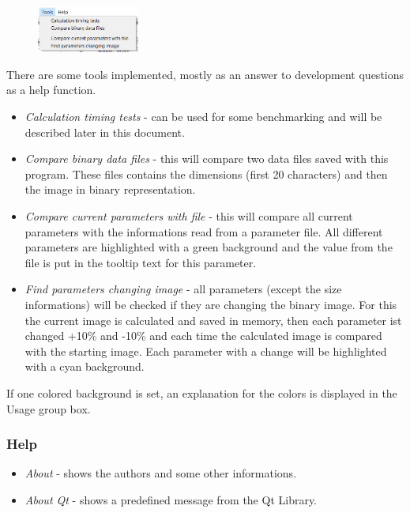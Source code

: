 \documentclass[11pt]{article} %
\begin{document}
\begin{figure}
  \begin{center}
    \includegraphics[width=0.30\textwidth]{menu-tools.png}
  \end{center}
\end{figure}
There are some tools implemented, mostly as an answer to development questions as a help function.
\begin{itemize}\itemsep0pt
\item {\it Calculation timing tests} - can be used for some benchmarking and will be described later in this document.
\item {\it Compare binary data files} - this will compare two data files saved with this program. These files contains the dimensions (first 20 characters) and then the image in binary representation.
\item {\it Compare current parameters with file} - this will compare all current parameters with the informations read from a parameter file. All different parameters are highlighted with a green background and the value from the file is put in the tooltip text for this parameter.
\item {\it Find parameters changing image} - all parameters (except the size informations) will be checked if they are changing the binary image. For this the current image is calculated and saved in memory, then each parameter ist changed +10\% and -10\% and each time the calculated image is compared with the starting image. Each parameter with a change will be highlighted with a cyan background.
\end{itemize}
If one colored background is set, an explanation for the colors is displayed in the Usage group box.

\subsubsection{Help}

\begin{itemize}\itemsep0pt
\item {\it About} - shows the authors and some other informations.
\item {\it About Qt} - shows a predefined message from the Qt Library.
\end{itemize}
\end{document}
